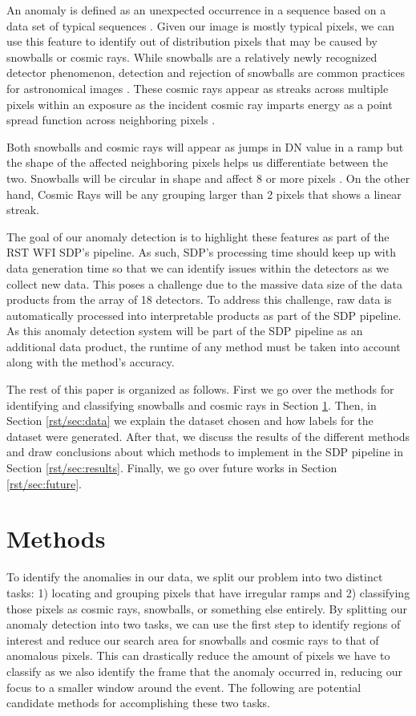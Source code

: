 An anomaly is defined as an unexpected occurrence in a sequence based on a data set of typical sequences \parencite{horton2021integrating}. 
Given our image is mostly typical pixels, we can use this feature to identify out of distribution pixels that may be caused by snowballs or cosmic rays. 
While snowballs are a relatively newly recognized detector phenomenon, detection and rejection of snowballs are common practices for astronomical images \parencite{van2001cosmic}.
These cosmic rays appear as streaks across multiple pixels within an exposure as the incident cosmic ray imparts energy as a point spread function across neighboring pixels \parencite{pych2003fast}.

Both snowballs and cosmic rays will appear as jumps in DN value in a ramp but the shape of the affected neighboring pixels helps us differentiate between the two.
Snowballs will be circular in shape and affect 8 or more pixels \parencite{cillis2018snowballs}.
On the other hand, Cosmic Rays will be any grouping larger than 2 pixels that shows a linear streak. 

The goal of our anomaly detection is to highlight these features as part of the RST WFI SDP's pipeline. 
As such, SDP's processing time should keep up with data generation time so that we can identify issues within the detectors as we collect new data. 
This poses a challenge due to the massive data size of the data products from the array of 18 detectors. 
To address this challenge, raw data is automatically processed into interpretable products as part of the SDP pipeline. 
As this anomaly detection system will be part of the SDP pipeline as an additional data product, the runtime of any method must be taken into account along with the method's accuracy. 

The rest of this paper is organized as follows.
First we go over the methods for identifying and classifying snowballs and cosmic rays in Section \ref{rst/sec:methods}.
Then, in Section \ref{rst/sec:data} we explain the dataset chosen and how labels for the dataset were generated.
After that, we discuss the results of the different methods and draw conclusions about which methods to implement in the SDP pipeline in Section \ref{rst/sec:results}.
Finally, we go over future works in Section \ref{rst/sec:future}.

\section{Methods}
\label{rst/sec:methods}
To identify the anomalies in our data, we split our problem into two distinct tasks: 1) locating and grouping pixels that have irregular ramps and 2) classifying those pixels as cosmic rays, snowballs, or something else entirely.
By splitting our anomaly detection into two tasks, we can use the first step to identify regions of interest and reduce our search area for snowballs and cosmic rays to that of anomalous pixels.
This can drastically reduce the amount of pixels we have to classify as we also identify the frame that the anomaly occurred in, reducing our focus to a smaller window around the event. 
The following are potential candidate methods for accomplishing these two tasks.

